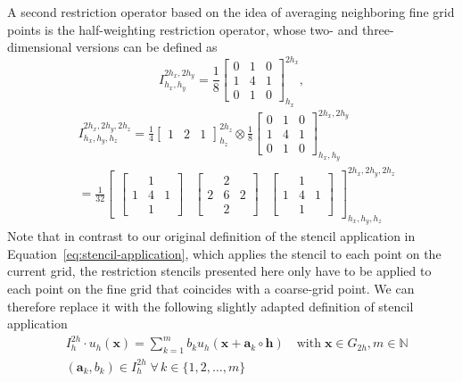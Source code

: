 A second restriction operator based on the idea of averaging neighboring fine grid points is the half-weighting restriction operator, whose two- and three-dimensional versions can be defined as
\begin{equation}
	I^{2h_x,2h_y}_{h_x, h_y} = \frac{1}{8}
	\begin{bmatrix}
		0 & 1 & 0 \\
		1 & 4 & 1 \\
		0 & 1 & 0
	\end{bmatrix}^{2h_x}_{h_x},
\end{equation} 
\begin{equation}
\begin{split}
	& I^{2h_x, 2h_y, 2h_z}_{h_x, h_y, h_z} = 
\frac{1}{4} \begin{bmatrix}
	1 & 2 & 1
\end{bmatrix}_{h_z}^{2h_z}
\otimes 
\frac{1}{8}
	\begin{bmatrix}
	0 & 1 & 0 \\
	1 & 4 & 1 \\
	0 & 1 & 0 
\end{bmatrix}^{2h_x,2h_y}_{h_x, h_y} \\
& =
\frac{1}{32} \begin{bmatrix}
	\begin{bmatrix}
		& 1 &  \\
		1 & 4 & 1 \\
		& 1 & 
	\end{bmatrix}
 &		\begin{bmatrix}
 	& 2 &  \\
 	2 & 6 & 2 \\
 	& 2 & 
 \end{bmatrix} &
	\begin{bmatrix}
	& 1 &  \\
	1 & 4 & 1 \\
	& 1 & 
\end{bmatrix}
\end{bmatrix}^{2h_x, 2h_y, 2h_z}_{h_x, h_y, h_z}
\end{split}
\end{equation} 
Note that in contrast to our original definition of the stencil application in Equation~\eqref{eq:stencil-application}, which applies the stencil to each point on the current grid, the restriction stencils presented here only have to be applied to each point on the fine grid that coincides with a coarse-grid point.
We can therefore replace it with the following slightly adapted definition of stencil application
\begin{equation}
	\begin{split}
		& I_{h}^{2h} \cdot u_h(\bm{x}) = \sum_{k=1}^m b_k u_h({\bm x + \bm{a}_k} \circ \bm{h}) \quad 
		\text{with} \; \bm{x} \in G_{2h}, m \in \mathbb{N} \\ & (\bm{a}_k, b_k) \in I_{h}^{2h} \; \forall \, k \in \{ 1, 2, \dots, m \}
	\end{split}
	\label{eq:stencil-restriction-application}
\end{equation}

